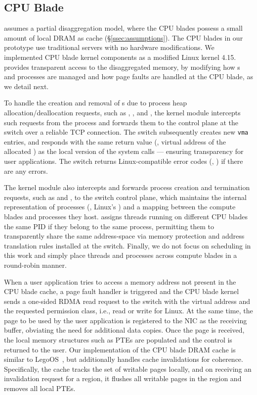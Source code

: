 \subsection{CPU Blade}
\label{ssec:cpumemimpl}

\mind assumes a partial disaggregation model, where the CPU blades possess a small amount of local DRAM as cache (\S\ref{ssec:assumptions}). The CPU blades in our prototype use traditional servers with no hardware modifications. We implemented CPU blade kernel components as a modified Linux kernel 4.15. \mind provides transparent access to the disaggregated memory, by modifying how s and processes are managed and how page faults are handled at the CPU blade, as we detail next.

 To handle the creation and removal of s due to process heap allocation/deallocation requests, such as , , and , the kernel module intercepts such requests from the process and forwards them to the control plane at the switch over a reliable TCP connection. The switch subsequently creates new \texttt{vma} entries, and responds with the same return value (\eg, virtual address of the allocated ) as the local version of the system calls --- ensuring transparency for user applications. The switch returns Linux-compatible error codes (\eg, ) if there are any errors.

 The kernel module also intercepts and forwards process creation and termination requests, such as  and , to the switch control plane, which maintains the internal representation of processes (\ie, Linux's ) and a mapping between the compute blades and processes they host. \mind assigns threads running on different CPU blades the same PID if they belong to the same process, permitting them to transparently share the same address-space via memory protection and address translation rules installed at the switch. Finally, we do not focus on scheduling in this work and simply place threads and processes across compute blades in a round-robin manner.

 When a user application tries to access a memory address not present in the CPU blade cache, a page fault handler is triggered and the CPU blade kernel sends a one-sided RDMA read request to the switch with the virtual address and the requested permission class, i.e., read or write for Linux. At the same time, the page to be used by the user application is registered to the NIC as the receiving buffer, obviating the need for additional data copies. Once the page is received, the local memory structures such as PTEs are populated and the control is returned to the user. Our implementation of the CPU blade DRAM cache is similar to LegoOS~\cite{legoos}, but additionally handles cache invalidations for coherence. Specifically, the cache tracks the set of writable pages locally, and on receiving an invalidation request for a region, it flushes all writable pages in the region and removes all local PTEs.

